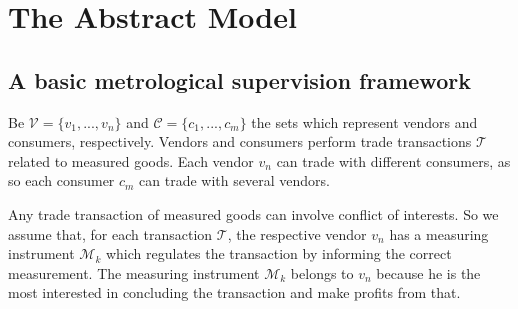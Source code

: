 \documentclass[sigplan]{acmart}
\begin{document}
% 

\section{The Abstract Model}
\subsection{A basic metrological supervision framework}
Be $\mathcal{V}=\{v_1, ..., v_n\}$ and $\mathcal{C}=\{c_1, ..., c_m\}$ the sets which represent vendors and consumers, respectively.
Vendors and consumers perform trade transactions $\mathcal{T}$ related to measured goods.
Each vendor $v_n$ can trade with different consumers, as so each consumer $c_m$ can trade with several vendors.


Any trade transaction of measured goods can involve conflict of interests.
So we assume that, for each transaction $\mathcal{T}$, the respective vendor $v_n$ has a measuring instrument $\mathcal{M}_k$ which regulates the transaction by informing the correct measurement.
The measuring instrument $\mathcal{M}_k$ belongs to $v_n$ because he is the most interested in concluding the transaction and make profits from that.
\end{document}

